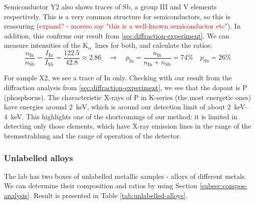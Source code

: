 \documentclass[11pt,a4paper,twoside,onecolumn]{article}
\newcommand{\reminder}[1]{\textcolor{red}{#1}}
\newcommand{\Kalpha}{$\mathrm{K}_\alpha$~}
\begin{document}
Semiconductor Y2 also shows traces of Sb, a group III and V elements respectively. This is a very common structure for semiconductors, so this is reassuring (\reminder{expand? - moreso say "this is a well-known semiconductor etc"}). In addition, this confirms our result from \ref{sec:diffraction-experiment}. We can measure intensities of the \Kalpha lines for both, and calculate the ratios:
\begin{equation}
    \frac{n_\mathrm{In}}{n_\mathrm{Sb}} = \frac{I_\mathrm{In}}{I_\mathrm{Sb}} = \frac{122.5}{42.8} \approx 2.86 \quad \Rightarrow \quad p_\mathrm{In} = \frac{n_\mathrm{In}}{n_\mathrm{In}+n_\mathrm{Sb}} = 74 \% \quad p_\mathrm{Sb} = 26 \%
\end{equation}

For sample X2, we see a trace of In only. Checking with our result from the diffraction analysis from \ref{sec:diffraction-experiment}, we see that the dopant is P (phosphorus). The characteristic X-rays of P in K-series (the most energetic ones) have energies around \qty{2}{keV}, which is around our detection limit of about \qtyrange{2}{4}{keV}. This highlights one of the shortcomings of our method: it is limited in detecting only those elements, which have X-ray emission lines in the range of the bremsstrahlung and the range of operation of the detector.

\subsubsection{Unlabelled alloys}\label{subsubsec:unlabelled-alloys}
The lab has two boxes of unlabelled metallic samples - alloys of different metals. We can determine their composition and ratios by using Section \ref{subsec:compos-analysis}. Result is presented in Table \ref{tab:unlabelled-alloys}.
\end{document}

